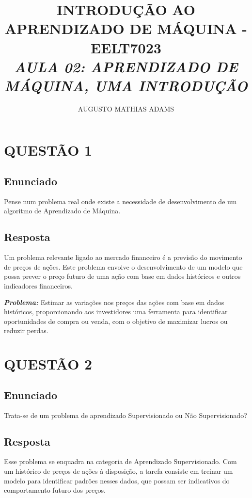 \documentclass[a4paper, 12pt, onecolumn,singlespacing]{article}
\title{\normalsize{INTRODUÇÃO AO APRENDIZADO DE MÁQUINA - EELT7023}\\ \huge{\textbf\textit{{AULA 02: APRENDIZADO DE MÁQUINA, UMA INTRODUÇÃO }}\\}}
\author{\small{AUGUSTO MATHIAS ADAMS}}
\begin{document}
	
	\maketitle
	
	\section{QUESTÃO 1}
	
	\subsection{Enunciado}
	
		Pense num problema real onde existe a necessidade de desenvolvimento de um algoritmo de Aprendizado de Máquina.
	
	\subsection{Resposta}
	
	Um problema relevante ligado ao mercado financeiro é a previsão do movimento de preços de ações. Este problema envolve o desenvolvimento de um modelo que possa prever o preço futuro de uma ação com base em dados históricos e outros indicadores financeiros.
	
	\textbf{\textit{Problema: }} Estimar as variações nos preços das ações com base em dados históricos, proporcionando aos investidores uma ferramenta para identificar oportunidades de compra ou venda, com o objetivo de maximizar lucros ou reduzir perdas.
	
	\section{QUESTÃO 2}
	
	\subsection{Enunciado}
	Trata-se de um problema de aprendizado Supervisionado ou Não Supervisionado?
	
	\subsection{Resposta}
	
	Esse problema se enquadra na categoria de Aprendizado Supervisionado. Com um histórico de preços de ações à disposição, a tarefa consiste em treinar um modelo para identificar padrões nesses dados, que possam ser indicativos do comportamento futuro dos preços.
	
\end{document}
